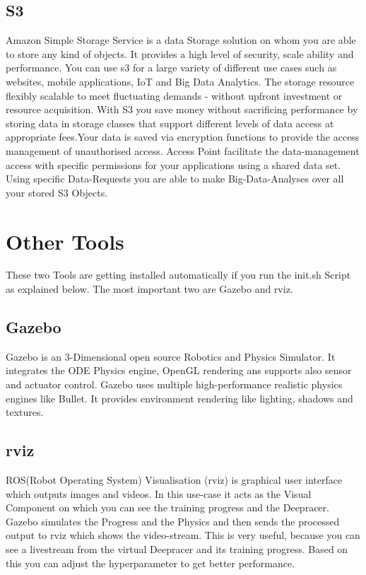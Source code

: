 \subsection{S3}
Amazon Simple Storage Service is a data Storage solution on whom you are able to store any kind of objects. It provides a high level of security, scale ability and performance. You can use s3 for a large variety of different use cases such as websites, mobile applications, IoT and Big Data Analytics. The storage resource flexibly scalable to meet fluctuating demands - without upfront investment or resource acquisition. With S3 you save money without sacrificing performance by storing data in storage classes that support different levels of data access at appropriate fees.Your data is saved via encryption functions to provide the access management of unauthorised access. Access Point facilitate the data-management access with specific permissions for your applications using a shared data set. Using specific Data-Requests you are able to make Big-Data-Analyses over all your stored S3 Objects.

\section{Other Tools}
These two Tools are getting installed automatically if you run the init.sh Script as explained below. The most important two are Gazebo and rviz.

\subsection{Gazebo}
Gazebo is an 3-Dimensional open source Robotics and Physics Simulator. It integrates the ODE Physics engine, OpenGL rendering ans supports also sensor and actuator control. Gazebo uses multiple high-performance realistic physics engines like Bullet. It provides environment rendering like lighting, shadows and textures. 

\subsection{rviz}
ROS(Robot Operating System) Visualisation (rviz) is graphical user interface which outputs images and videos. In this use-case it acts as the Visual Component on which you can see the training progress and the Deepracer. Gazebo simulates the Progress and the Physics and then sends the processed output to rviz which shows the video-stream. This is very useful, because you can see a livestream from the virtual Deepracer and its training progress. Based on this you can adjust the hyperparameter to get better performance.

